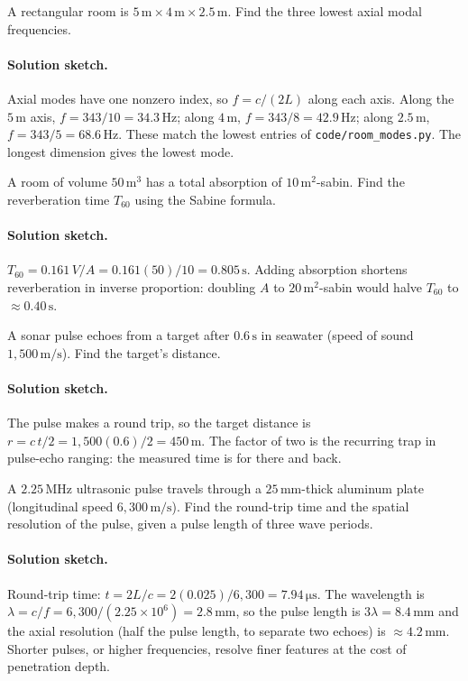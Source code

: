\begin{exercise}
A rectangular room is $5\,\si{\meter} \times 4\,\si{\meter} \times
2.5\,\si{\meter}$. Find the three lowest axial modal frequencies.
\paragraph{Solution sketch.} Axial modes have one nonzero index, so
$f = c/(2L)$ along each axis. Along the $5\,\si{\meter}$ axis,
$f = 343/10 = 34.3\,\si{\hertz}$; along $4\,\si{\meter}$,
$f = 343/8 = 42.9\,\si{\hertz}$; along $2.5\,\si{\meter}$,
$f = 343/5 = 68.6\,\si{\hertz}$. These match the lowest entries of
\texttt{code/room\_modes.py}. The longest dimension gives the lowest
mode.
\end{exercise}

\begin{exercise}
A room of volume $50\,\si{\meter\cubed}$ has a total absorption of
$10\,\si{\meter\squared}$-sabin. Find the reverberation time $T_{60}$
using the Sabine formula.
\paragraph{Solution sketch.}
$T_{60} = 0.161\,V/A = 0.161(50)/10 = 0.805\,\si{\second}$. Adding
absorption shortens reverberation in inverse proportion: doubling $A$
to $20\,\si{\meter\squared}$-sabin would halve $T_{60}$ to
$\approx 0.40\,\si{\second}$.
\end{exercise}

\begin{exercise}
A sonar pulse echoes from a target after $0.6\,\si{\second}$ in
seawater (speed of sound $1{,}500\,\si{\meter\per\second}$). Find the
target's distance.
\paragraph{Solution sketch.} The pulse makes a round trip, so the
target distance is $r = c\,t/2 = 1{,}500(0.6)/2 = 450\,\si{\meter}$.
The factor of two is the recurring trap in pulse-echo ranging: the
measured time is for there and back.
\end{exercise}

\begin{exercise}
A $2.25\,\si{\mega\hertz}$ ultrasonic pulse travels through a
$25\,\si{\milli\meter}$-thick aluminum plate (longitudinal speed
$6{,}300\,\si{\meter\per\second}$). Find the round-trip time and the
spatial resolution of the pulse, given a pulse length of three wave
periods.
\paragraph{Solution sketch.} Round-trip time:
$t = 2L/c = 2(0.025)/6{,}300 = 7.94\,\si{\micro\second}$. The
wavelength is $\lambda = c/f = 6{,}300/(2.25\times 10^{6}) =
2.8\,\si{\milli\meter}$, so the pulse length is
$3\lambda = 8.4\,\si{\milli\meter}$ and the axial resolution (half the
pulse length, to separate two echoes) is $\approx 4.2\,\si{
\milli\meter}$. Shorter pulses, or higher frequencies, resolve finer
features at the cost of penetration depth.
\end{exercise}

